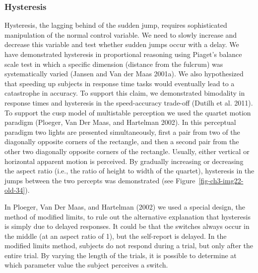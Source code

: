 \documentclass[
  a4paper,
  DIV=11,
  numbers=noendperiod]{scrreprt}
\begin{document}
\hypertarget{sec-Hysteresis}{%
\subsubsection{Hysteresis}\label{sec-Hysteresis}}

Hysteresis, the lagging behind of the sudden jump, requires
sophisticated manipulation of the normal control variable. We need to
slowly increase and decrease this variable and test whether sudden jumps
occur with a delay. We have demonstrated hysteresis in proportional
reasoning using Piaget's balance scale test in which a specific
dimension (distance from the fulcrum) was systematically varied (Jansen
and Van der Maas 2001a). We also hypothesized that speeding up subjects
in response time tasks would eventually lead to a catastrophe in
accuracy. To support this claim, we demonstrated bimodality in response
times and hysteresis in the speed-accuracy trade-off (Dutilh et al.
2011). To support the cusp model of multistable perception we used the
quartet motion paradigm (Ploeger, Van Der Maas, and Hartelman 2002). In
this perceptual paradigm two lights are presented simultaneously, first
a pair from two of the diagonally opposite corners of the rectangle, and
then a second pair from the other two diagonally opposite corners of the
rectangle. Usually, either vertical or horizontal apparent motion is
perceived. By gradually increasing or decreasing the aspect ratio (i.e.,
the ratio of height to width of the quartet), hysteresis in the jumps
between the two percepts was demonstrated (see
Figure~\ref{fig-ch3-img22-old-34}).

In Ploeger, Van Der Maas, and Hartelman (2002) we used a special design,
the method of modified limits, to rule out the alternative explanation
that hysteresis is simply due to delayed responses. It could be that the
switches always occur in the middle (at an aspect ratio of 1), but the
self-report is delayed. In the modified limits method, subjects do not
respond during a trial, but only after the entire trial. By varying the
length of the trials, it is possible to determine at which parameter
value the subject perceives a switch.
\end{document}
